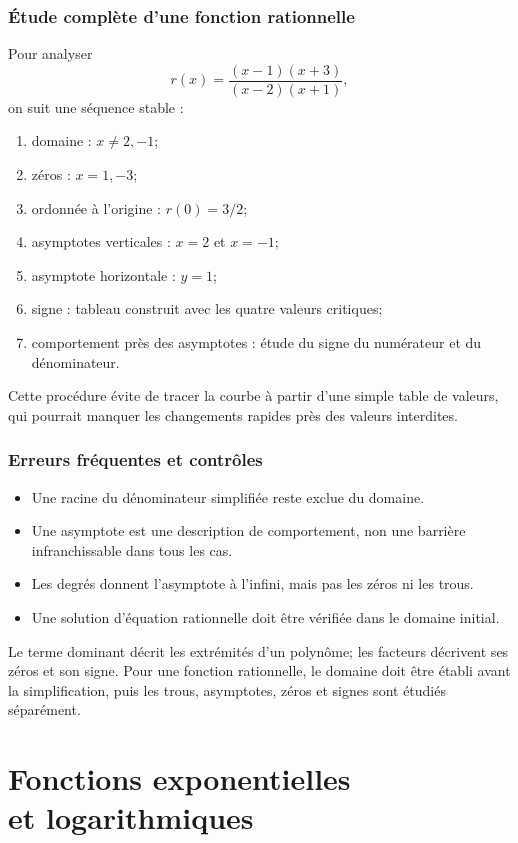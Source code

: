 \documentclass[12pt,a4paper,openany]{book}
\begin{document}
\subsection{Étude complète d'une fonction rationnelle}

Pour analyser
\[
r(x)=\frac{(x-1)(x+3)}{(x-2)(x+1)},
\]
on suit une séquence stable :
\begin{enumerate}
\item domaine : $x\neq2,-1$;
\item zéros : $x=1,-3$;
\item ordonnée à l'origine : $r(0)=3/2$;
\item asymptotes verticales : $x=2$ et $x=-1$;
\item asymptote horizontale : $y=1$;
\item signe : tableau construit avec les quatre valeurs critiques;
\item comportement près des asymptotes : étude du signe du numérateur et du dénominateur.
\end{enumerate}
Cette procédure évite de tracer la courbe à partir d'une simple table de valeurs, qui pourrait manquer les changements rapides près des valeurs interdites.

\subsection{Erreurs fréquentes et contrôles}

\begin{itemize}
\item Une racine du dénominateur simplifiée reste exclue du domaine.
\item Une asymptote est une description de comportement, non une barrière infranchissable dans tous les cas.
\item Les degrés donnent l'asymptote à l'infini, mais pas les zéros ni les trous.
\item Une solution d'équation rationnelle doit être vérifiée dans le domaine initial.
\end{itemize}

\begin{summarybox}
Le terme dominant décrit les extrémités d'un polynôme; les facteurs décrivent ses zéros et son signe. Pour une fonction rationnelle, le domaine doit être établi avant la simplification, puis les trous, asymptotes, zéros et signes sont étudiés séparément.
\end{summarybox}


\chapter[Fonctions exponentielles et logarithmiques]{Fonctions exponentielles\\et logarithmiques}
\end{document}
